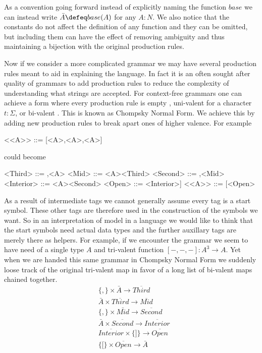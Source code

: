 As a convention going forward instead of explicitly naming the function $base$
we can instead write $\bar{A}\defeq base(A)$ for any $A:N$.  We also notice that 
the constants do not affect the definition of any function and they can be 
omitted, but including them can have the effect of removing ambiguity and thus 
maintaining a bijection with the original production rules.


Now if we consider a more complicated grammar we may have several production rules 
meant to aid in explaining the language.  In fact it is an often sought after 
quality of grammars to add production rules to reduce the complexity of understanding 
what strings are accepted.  For context-free grammars one can achieve a form 
where every production rule is empty , uni-valent 
for a character $t:\Sigma$, or bi-valent . This is 
known as Chompsky Normal Form.
We achieve this by adding new production rules to break apart ones of higher 
valence.  For example
\begin{center}
\begin{Gcode}[]
<<A>> ::= [<A>,<A>,<A>]
\end{Gcode}
\end{center}
could become
\begin{center}
\begin{Gcode}[]
   <Third> ::= ,<A>
     <Mid> ::= <A><Third>
  <Second> ::= ,<Mid>
<Interior> ::= <A><Second>
    <Open> ::= <Interior>]
     <<A>> ::= [<Open>
\end{Gcode}
\end{center}
As a result of intermediate tags we cannot generally assume every tag 
is a start symbol.  These other tags are therefore used in the construction 
of the symbols we want.  So in an interpretation of model in a language 
we would like to think that the start symbols need actual data types 
and the further auxillary tags are merely there as helpers.  For example,
if we encounter the grammar 
we seem to have need of a single type $A$ and tri-valent function 
$[-,-,-]:A^3\to A$.  Yet when we are handed this same grammar in Chompsky 
Normal Form we suddenly loose track of the original tri-valent map 
in favor of a long list of bi-valent maps chained together.
\begin{align*}
    & \{,\}\times \bar{A}\to \overline{Third}\\
    & \bar{A}\times \overline{Third}\to \overline{Mid}\\
    & \{,\}\times \bar{Mid}\to \overline{Second}\\
    & \bar{A}\times \overline{Second}\to \overline{Interior}\\
    & \overline{Interior}\times \{]\}\to \overline{Open}\\
    & \{[\}\times \overline{Open}\to \bar{A}\\
\end{align*}
